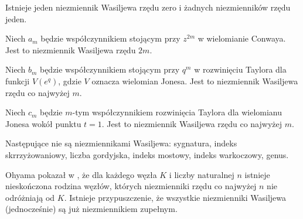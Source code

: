 Istnieje jeden niezmiennik Wasiljewa rzędu zero i żadnych niezmienników rzędu jeden.

\begin{example}
	Niech $a_m$ będzie współczynnikiem stojącym przy $z^{2m}$ w wielomianie Conwaya.
	Jest to niezmiennik Wasiljewa rzędu $2m$.
\end{example}

\begin{example}
	Niech $b_m$ będzie współczynnikiem stojącym przy $q^m$ w rozwinięciu Taylora dla funkcji $V(e^q)$, gdzie $V$ oznacza wielomian Jonesa.
	Jest to niezmiennik Wasiljewa rzędu co najwyżej $m$.
\end{example}

\begin{example}
	Niech $c_m$ będzie $m$-tym współczynnikiem rozwinięcia Taylora dla wielomianu Jonesa wokół punktu $t = 1$.
	Jest to niezmiennik Wasiljewa rzędu co najwyżej $m$.
\end{example}


Następujące nie są niezmiennikami Wasiljewa: sygnatura, indeks skrrzyżowaniowy, liczba gordyjska, indeks mostowy, indeks warkoczowy, genus.


Ohyama pokazał w \cite{ohyama95}, że dla każdego węzła $K$ i liczby naturalnej $n$ istnieje nieskończona rodzina węzłów, których niezmienniki rzędu co najwyżej $n$ nie odróżniają od $K$.
Istnieje przypuszczenie, że wszystkie niezmienniki Wasiljewa (jednocześnie) są już niezmiennikiem zupełnym.